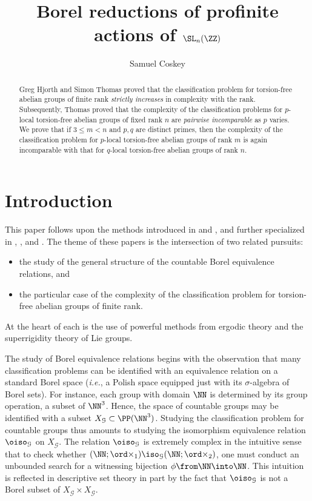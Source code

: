 \documentclass[oneside,leqno,11pt]{amsart}
\title[Samuel Coskey: Profinite actions of $\SL_n(\ZZ)$]{Borel
  reductions of profinite actions of $\SL_n(\ZZ)$}
\author{Samuel Coskey}
\begin{document}
\begin{abstract}
  Greg Hjorth and Simon Thomas proved that the classification problem
  for torsion-free abelian groups of finite rank \emph{strictly
    increases} in complexity with the rank.  Subsequently, Thomas
  proved that the complexity of the classification problems for
  $p$-local torsion-free abelian groups of fixed rank $n$ are
  \emph{pairwise incomparable} as $p$ varies.  We prove that if $3\leq
  m<n$ and $p,q$ are distinct primes, then the complexity of the
  classification problem for $p$-local torsion-free abelian groups of
  rank $m$ is again incomparable with that for $q$-local torsion-free
  abelian groups of rank $n$.
\end{abstract}
\maketitle

\section{Introduction}

This paper follows upon the methods introduced in \cite{hjorth} and
\cite{adamskechris}, and further specialized in \cite{super},
\cite{plocal}, and \cite{quasi}.  The theme of these papers is the
intersection of two related pursuits:
\begin{itemize}
\item the study of the general structure of the countable Borel
  equivalence relations, and
\item the particular case of the complexity of the classification
  problem for torsion-free abelian groups of finite rank.
\end{itemize}
At the heart of each is the use of powerful methods from
ergodic theory and the superrigidity theory of Lie groups.

The study of Borel equivalence relations begins with the observation
that many classification problems can be identified with an
equivalence relation on a standard Borel space (\emph{i.e.}, a Polish
space equipped just with its $\sigma$-algebra of Borel sets).  For
instance, each group with domain $\NN$ is determined by its group
operation, a subset of $\NN^3$.  Hence, the space of countable groups
may be identified with a subset $X_{\mathcal G}\subset\PP(\NN^3)$.
Studying the classification problem for countable groups thus amounts
to studying the isomorphism equivalence relation $\oiso_{\mathcal G}$
on $X_{\mathcal G}$.  The relation $\oiso_{\mathcal G}$ is extremely
complex in the intuitive sense that to check whether
$(\NN;\ord\times_1)\iso_{\mathcal G}(\NN;\ord\times_2)$, one must
conduct an unbounded search for a witnessing bijection
$\phi\from\NN\into\NN$.  This intuition is reflected in descriptive
set theory in part by the fact that $\oiso_{\mathcal G}$ is not a
Borel subset of $X_{\mathcal G}\times X_{\mathcal G}$.
\end{document}
